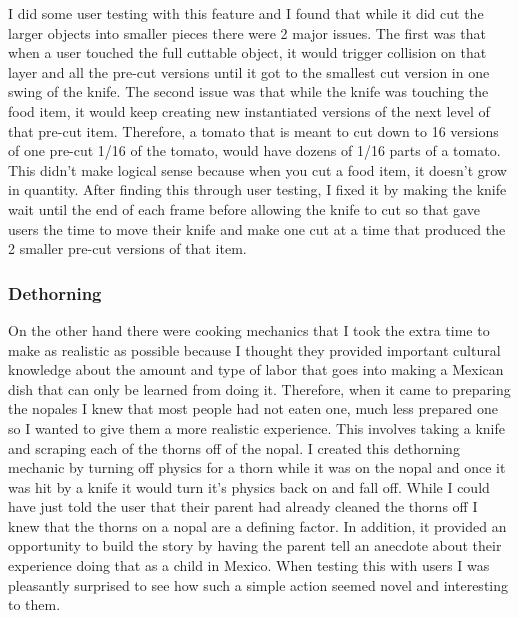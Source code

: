 \documentclass[10pt,twocolumn]{article}
\begin{document}
I did some user testing with this feature and I found that while it did cut the larger objects into smaller pieces there were 2 major issues. The first was that when a user touched the full cuttable object, it would trigger collision on that layer and all the pre-cut versions until it got to the smallest cut version in one swing of the knife. The second issue was that while the knife was touching the food item, it would keep creating new instantiated versions of the next level of that pre-cut item. Therefore, a tomato that is meant to cut down to 16 versions of one pre-cut 1/16 of the tomato, would have dozens of 1/16 parts of a tomato. This didn’t make logical sense because when you cut a food item, it doesn’t grow in quantity. After finding this through user testing, I fixed it by making the knife wait until the end of each frame before allowing the knife to cut so that gave users the time to move their knife and make one cut at a time that produced the 2 smaller pre-cut versions of that item. 

\subsubsection{Dethorning}
On the other hand there were cooking mechanics that I took the extra time to make as realistic as possible because I thought they provided important cultural knowledge about the amount and type of labor that goes into making a Mexican dish that can only be learned from doing it. Therefore, when it came to preparing the nopales I knew that most people had not eaten one, much less prepared one so I wanted to give them a more realistic experience. This involves taking a knife and scraping each of the thorns off of the nopal. I created this dethorning mechanic by turning off physics for a thorn while it was on the nopal and once it was hit by a knife it would turn it’s physics back on and fall off.  While I could have just told the user that their parent had already cleaned the thorns off I knew that the thorns on a nopal are a defining factor. In addition, it provided an opportunity to build the story by having the parent tell an anecdote about their experience doing that as a child in Mexico. When testing this with users I was pleasantly surprised to see how such a simple action seemed novel and interesting to them.  
\end{document}

